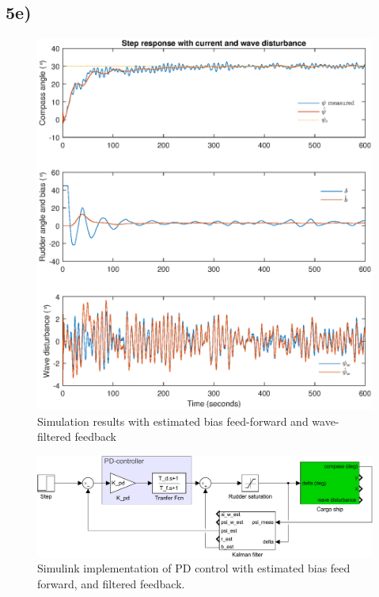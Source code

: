 \subsection{5e)}

\begin{figure}
    \centering
    \includegraphics[width=\textwidth]{images/oppg5/5e.eps}
    \caption{Simulation results with estimated bias feed-forward and wave-filtered feedback}
    \label{fig:5e}
\end{figure}

\begin{figure}
    \centering
    \includegraphics[width=\textwidth]{images/oppg5/bias_FF_and_filtered_FB.pdf}
    \caption{Simulink implementation of PD control with estimated bias feed forward, and filtered feedback.}
    \label{fig:filtered_fb}
\end{figure}
